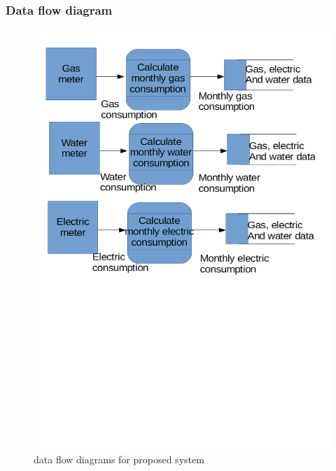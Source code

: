 \subsubsection{Data flow diagram}
\begin{figure}[H]
    \includegraphics[width=\textwidth]{./dataflowdiagrams3.png}
    \caption{data flow diagrams for proposed system} \label{fig:dataflowdiagrams}
\end{figure}

